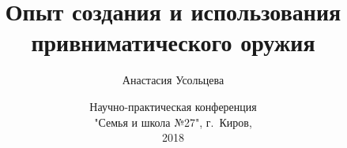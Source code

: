 


\date{Научно-практическая конференция\\"Семья и школа №27", г.~Киров, \\2018}
\author[А.~Усольцева]{Анастасия Усольцева}

\title[Привниматическое оружие]{Опыт создания и использования привниматического оружия}

\newcommand{\myDevice}{ТРЕНЬК-2}







